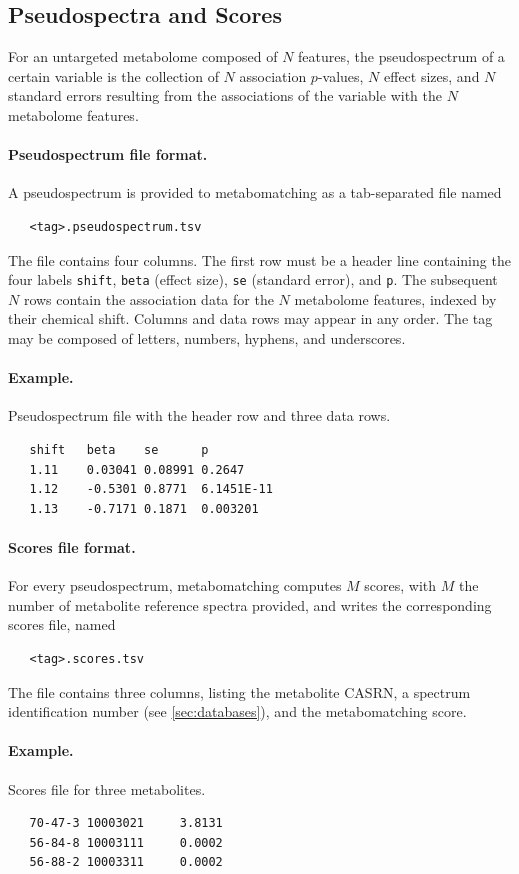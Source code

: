 \documentclass[a4paper,11pt]{article}
\begin{document}
\subsection{Pseudospectra and Scores\label{sec:pseudospectra}}
For an untargeted metabolome composed of $N$ features, the pseudospectrum of a certain variable is the collection of $N$ association $p$-values, $N$ effect sizes, and $N$ standard errors resulting from the associations of the variable with the $N$ metabolome features.
\paragraph{Pseudospectrum file format.} A pseudospectrum is provided to metabomatching as a tab-separated file named 
\begin{verbatim}
   <tag>.pseudospectrum.tsv
\end{verbatim}
The file contains four columns. The first row must be a header line containing the four labels \verb|shift|, \verb|beta| (effect size), \verb|se| (standard error), and \verb|p|. The subsequent $N$ rows contain the association data for the $N$ metabolome features, indexed by their chemical shift. Columns and data rows may appear in any order. The tag may be composed of letters, numbers, hyphens, and underscores.
\paragraph{Example.} Pseudospectrum file with the header row and three data rows.
\begin{verbatim}
   shift   beta    se      p
   1.11    0.03041 0.08991 0.2647  
   1.12    -0.5301 0.8771  6.1451E-11
   1.13    -0.7171 0.1871  0.003201
\end{verbatim}
\paragraph{Scores file format.} For every pseudospectrum, metabomatching computes $M$ scores, with $M$ the number of metabolite reference spectra provided, and writes the corresponding scores file, named 
\begin{verbatim}
   <tag>.scores.tsv
\end{verbatim}
The file contains three columns, listing the metabolite CASRN, a spectrum identification number (see \ref{sec:databases}), and the metabomatching score.
\paragraph{Example.} Scores file for three metabolites.
\begin{verbatim}
   70-47-3 10003021     3.8131
   56-84-8 10003111     0.0002
   56-88-2 10003311     0.0002
\end{verbatim}
\end{document}
